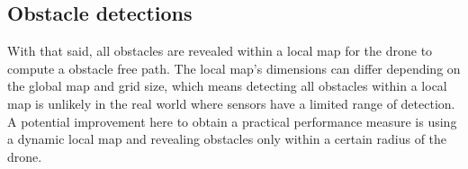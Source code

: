 \subsection{Obstacle detections}
With that said, all obstacles are revealed within a local map for the drone to compute a obstacle free path. The local map's dimensions can differ depending on the global map and grid size, which means detecting all obstacles within a local map is unlikely in the real world where sensors have a limited range of detection. \\
 A potential improvement here to obtain a practical performance measure is using a dynamic local map and revealing obstacles only within a certain radius of the drone.

